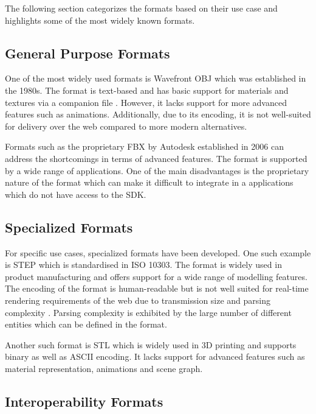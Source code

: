 The following section categorizes the formats based on their use case and highlights some of the most widely known formats.

\subsection{General Purpose Formats}

One of the most widely used formats is Wavefront \gls{OBJ} which was established in the 1980s. The format is text-based and has basic support for materials and textures via a companion file . However, it lacks support for more advanced features such as animations. Additionally, due to its encoding, it is not well-suited for delivery over the web compared to more modern alternatives.

Formats such as the proprietary FBX by Autodesk established in 2006 can address the shortcomings in terms of advanced features. The format is supported by a wide range of applications. One of the main disadvantages is the proprietary nature of the format  which can make it difficult to integrate in a applications which do not have access to the SDK.

\subsection{Specialized Formats}
\label{ch:specializedFormats}

For specific use cases, specialized formats have been developed. One such example is \gls{STEP} which is standardised in ISO 10303. The format is widely used in product manufacturing and offers support for a wide range of modelling features. The  encoding of the format is human-readable but is not well suited for real-time rendering requirements of the web due to transmission size and parsing complexity \cite{marjudi2010StepIgesreview}. Parsing complexity is exhibited by the large number of different entities which can be defined in the format.

Another such format is STL which is widely used in 3D printing and supports binary as well as \gls{ASCII} encoding. It lacks support for advanced features such as material representation, animations and scene graph.

\subsection{Interoperability Formats}

